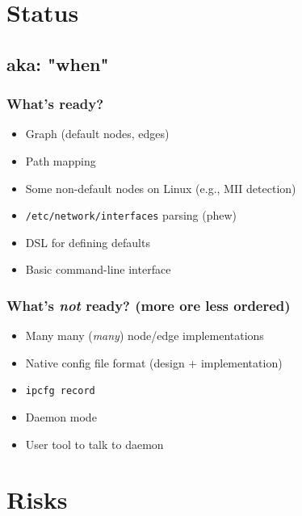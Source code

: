 \documentclass[ignorenonframetext]{beamer}
\begin{document}
\section{Status}
\subsection{aka: "when"}
\begin{frame}
  \frametitle{What's ready?}
  \begin{itemize}
    \item Graph (default nodes, edges)
    \item Path mapping
    \item Some non-default nodes on Linux (e.g., MII detection)
    \item \texttt{/etc/network/interfaces} parsing (phew)
    \item DSL for defining defaults
    \item Basic command-line interface
  \end{itemize}
\end{frame}

\begin{frame}
  \frametitle{What's \emph{not} ready? (more ore less ordered)}
  \begin{itemize}
    \item Many many (\emph{many}) node/edge implementations
    \item Native config file format (design + implementation)
    \item \texttt{ipcfg record}
    \item Daemon mode
    \item User tool to talk to daemon
  \end{itemize}
\end{frame}

\section{Risks}
\end{document}
